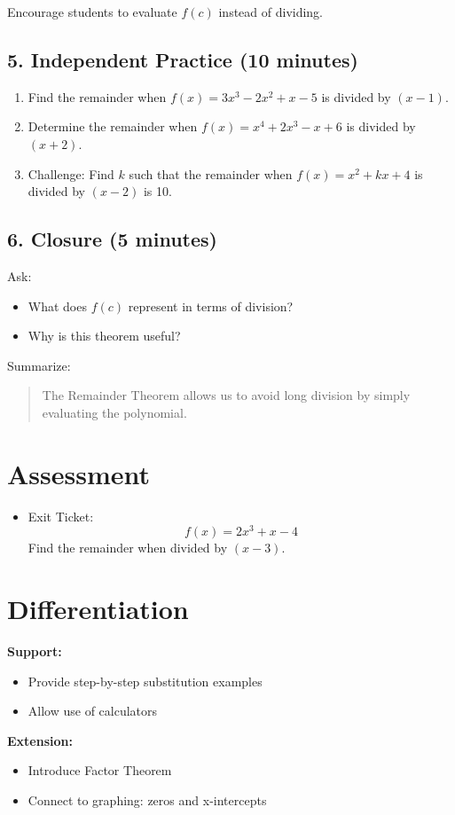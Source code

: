 \documentclass[10pt]{article}
\begin{document}
Encourage students to evaluate $f(c)$ instead of dividing.

\subsection*{5. Independent Practice (10 minutes)}

\begin{enumerate}[label=\arabic*.]
    \item Find the remainder when $f(x) = 3x^3 - 2x^2 + x - 5$ is divided by $(x - 1)$.
    \item Determine the remainder when $f(x) = x^4 + 2x^3 - x + 6$ is divided by $(x + 2)$.
    \item Challenge: Find $k$ such that the remainder when $f(x) = x^2 + kx + 4$ is divided by $(x - 2)$ is 10.
\end{enumerate}

\subsection*{6. Closure (5 minutes)}

Ask:
\begin{itemize}
    \item What does $f(c)$ represent in terms of division?
    \item Why is this theorem useful?
\end{itemize}

Summarize:
\begin{quote}
The Remainder Theorem allows us to avoid long division by simply evaluating the polynomial.
\end{quote}

\section*{Assessment}
\begin{itemize}
    \item Exit Ticket:
    \[
    f(x) = 2x^3 + x - 4
    \]
    Find the remainder when divided by $(x - 3)$.
\end{itemize}

\section*{Differentiation}

\textbf{Support:}
\begin{itemize}
    \item Provide step-by-step substitution examples
    \item Allow use of calculators
\end{itemize}

\textbf{Extension:}
\begin{itemize}
    \item Introduce Factor Theorem
    \item Connect to graphing: zeros and x-intercepts
\end{itemize}
\end{document}
